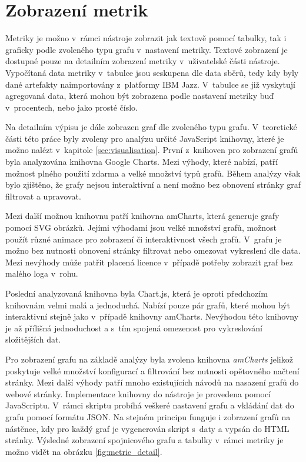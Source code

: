 \documentclass[czech,master]{diploma}
\begin{document}
\section{Zobrazení metrik}
Metriky je možno v~rámci nástroje zobrazit jak textově pomocí tabulky, tak i graficky podle zvoleného typu grafu v~nastavení metriky. Textové zobrazení je dostupné pouze na detailním zobrazení metriky v~uživatelské části nástroje. Vypočítaná data metriky v~tabulce jsou seskupena dle data sběrů, tedy kdy byly dané artefakty naimportovány z~platformy IBM Jazz. V~tabulce se již vyskytují agregovaná data, která mohou být zobrazena podle nastavení metriky buď v~procentech, nebo jako prosté číslo.

Na detailním výpisu je dále zobrazen graf dle zvoleného typu grafu. V~teoretické části této práce byly zvoleny pro analýzu určité JavaScript knihovny, které je možno nalézt v~kapitole \ref{sec:visualisation}. První z~knihoven pro zobrazení grafů byla analyzována knihovna Google Charts. Mezi výhody, které nabízí, patří možnost plného použití zdarma a velké množství typů grafů. Během analýzy však bylo zjištěno, že grafy nejsou interaktivní a není možno bez obnovení stránky graf filtrovat a upravovat.

Mezi další možnou knihovnu patří knihovna amCharts, která generuje grafy pomocí SVG obrázků. Jejími výhodami jsou velké množství grafů, možnost použít různé animace pro zobrazení či interaktivnost všech grafů. V~grafu je možno bez nutnosti obnovení stránky filtrovat nebo omezovat vykreslení dle data. Mezi nevýhody může patřit placená licence v~případě potřeby zobrazit graf bez malého loga v~rohu.

Poslední analyzovaná knihovna byla Chart.js, která je oproti předchozím knihovnám velmi malá a jednoduchá. Nabízí pouze pár grafů, které mohou být interaktivní stejně jako v~případě knihovny amCharts. Nevýhodou této knihovny je až přílišná jednoduchost a s~tím spojená omezenost pro vykreslování složitějších dat.

Pro zobrazení grafu na základě analýzy byla zvolena knihovna \textit{amCharts} jelikož poskytuje velké množství konfigurací a filtrování bez nutnosti opětovného načtení stránky. Mezi další výhody patří mnoho existujících návodů na nasazení grafů do webové stránky. Implementace knihovny do nástroje je provedena pomocí JavaScriptu. V~rámci skriptu probíhá veškeré nastavení grafu a vkládání dat do grafu pomocí formátu JSON. Na stejném principu funguje i zobrazení grafů na nástěnce, kdy pro každý graf je vygenerován skript s~daty a vypsán do HTML stránky. Výsledné zobrazení spojnicového grafu a tabulky v~rámci metriky je možno vidět na obrázku \ref{fig:metric_detail}.
\end{document}
